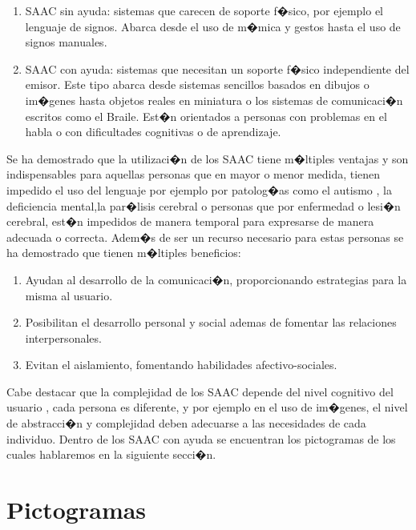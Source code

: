 \begin{enumerate}
\item SAAC sin ayuda: sistemas que carecen de soporte f�sico, por ejemplo el lenguaje de signos. Abarca desde el uso de m�mica y gestos hasta el uso de signos manuales.
\item SAAC con ayuda: sistemas que necesitan un soporte f�sico independiente del emisor. Este tipo abarca desde sistemas sencillos basados en dibujos o im�genes hasta objetos reales en miniatura o los sistemas de comunicaci�n escritos como el Braile. Est�n orientados a personas con problemas en el habla o con dificultades cognitivas o de aprendizaje.

\end{enumerate}
 
Se ha demostrado que la utilizaci�n de los SAAC tiene m�ltiples ventajas \citep{LorenzoAlvarezTFG2013} y son indispensables para aquellas personas que en mayor o menor medida, tienen impedido el uso del lenguaje por ejemplo por patolog�as como el autismo \citep{WarrickAnneCSH2010}, la deficiencia mental,la par�lisis cerebral o personas que por enfermedad o lesi�n cerebral, est�n impedidos de manera temporal para expresarse de manera adecuada o correcta. Adem�s de ser un recurso necesario para estas personas se ha demostrado que tienen m�ltiples beneficios:
 
 \begin{enumerate}
 
 \item Ayudan al desarrollo de la comunicaci�n, proporcionando estrategias para la misma al usuario.
 \item Posibilitan el desarrollo personal y social ademas de fomentar las relaciones interpersonales.
 \item Evitan el aislamiento, fomentando habilidades afectivo-sociales.
 
  \end{enumerate}

  Cabe destacar que la complejidad de los SAAC depende del nivel cognitivo del usuario \citep{DoloresAbril2010}, cada persona es diferente, y por ejemplo en el uso de im�genes, el nivel de abstracci�n y complejidad deben adecuarse a las necesidades de cada individuo. Dentro de los SAAC con ayuda se encuentran los pictogramas de los cuales hablaremos en la siguiente secci�n.

 
\section{Pictogramas}
\label{cap2:sec:Pictogramas}

